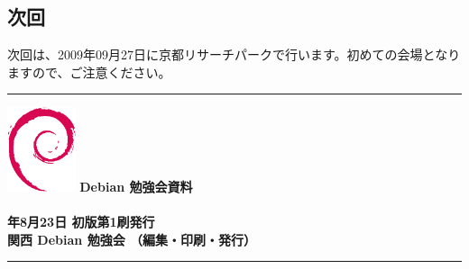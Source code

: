 \documentclass[mingoth,a4paper]{jsarticle}
\newcommand{\debmtgyear}{2009}
\newcommand{\debmtgdate}{23}
\newcommand{\debmtgmonth}{8}
\begin{document}

\subsection{次回}
次回は、2009年09月27日に京都リサーチパークで行います。初めての会場となりますので、ご注意ください。


\printindex
 \cleartooddpage

 \begin{minipage}[b]{0.2\hsize}
 \end{minipage}
 \begin{minipage}[b]{0.8\hsize}

 \vspace*{15cm}
 \rule{\hsize}{1mm}
 \vspace{2mm}
 \includegraphics[width=2cm]{image200502/openlogo-nd.eps}
 \noindent \Large \bf Debian 勉強会資料\\ \\
 \noindent \normalfont \debmtgyear{}年\debmtgmonth{}月\debmtgdate{}日 \hspace{5mm}  初版第1刷発行\\
 \noindent \normalfont 関西 Debian 勉強会 （編集・印刷・発行）\\
 \rule{\hsize}{1mm}
 \end{minipage}
\end{document}
